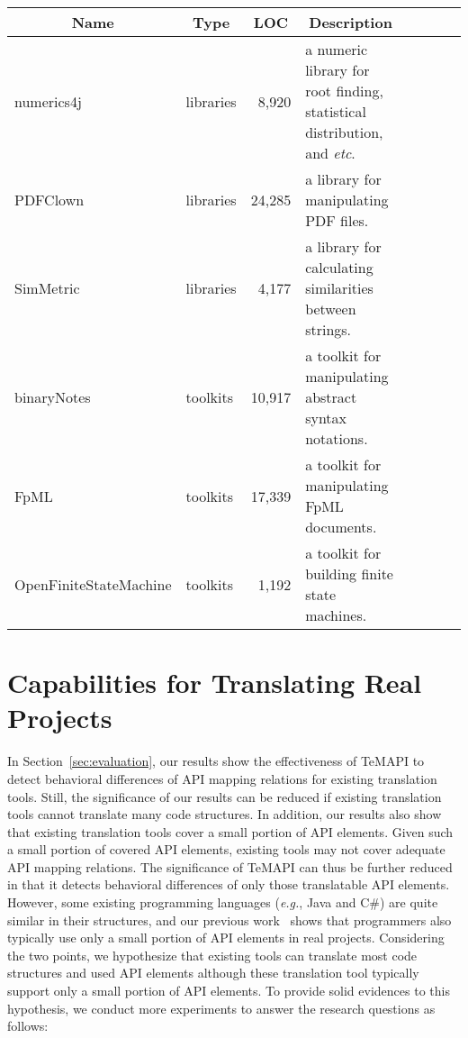 \begin{table*}[t]
\centering
\begin{SmallOut}
\begin {tabular} {|l|l|r|l|c|c|c|c|}
\hline
\multicolumn{1}{|c|}{\textbf{Name}}& \multicolumn{1}{c|}{\textbf{Type}}& \multicolumn{1}{|c|}{\textbf{LOC} } &\multicolumn{1}{c|}{\textbf{Description}}\\
\hline\hline
numerics4j      &  libraries & 8,920   & a numeric library for root finding, statistical distribution, and \emph{etc}. \\
\hline
PDFClown    &  libraries  & 24,285   & a library for manipulating PDF files.\\
\hline
SimMetric & libraries & 4,177 & a library for calculating similarities between strings.\\
\hline
binaryNotes  &  toolkits & 10,917 &  a toolkit for manipulating abstract syntax notations.\\
\hline
FpML         &  toolkits   & 17,339  & a toolkit for manipulating FpML documents. \\
\hline
OpenFiniteStateMachine &  toolkits   & 1,192 & a toolkit for building finite state machines.\\
\hline
\end{tabular}%
 \label{table:subjects2}
\end{SmallOut}%
\end{table*}
\section{Capabilities for Translating Real Projects}
\label{sec:real}
In Section~\ref{sec:evaluation}, our results show the effectiveness of TeMAPI to detect behavioral differences of API mapping relations for existing translation tools. Still, the significance of our results can be reduced if existing translation tools cannot translate many code structures. In addition, our results also show that existing translation tools cover a small portion of API elements. Given such a small portion of covered API elements, existing tools may not cover adequate API mapping relations. The significance of TeMAPI can thus be further reduced in that it detects behavioral differences of only those translatable API elements. However, some existing programming languages (\emph{e.g.}, Java and C\#) are quite similar in their structures, and our previous work~\citep{thummalapentaase08spotweb} shows that programmers also typically use only a small portion of API elements in real projects. Considering the two points, we hypothesize that existing tools can translate most code structures and used API elements although these translation tool typically support only a small portion of API elements. To provide solid evidences to this hypothesis, we conduct more experiments to answer the research questions as follows:

